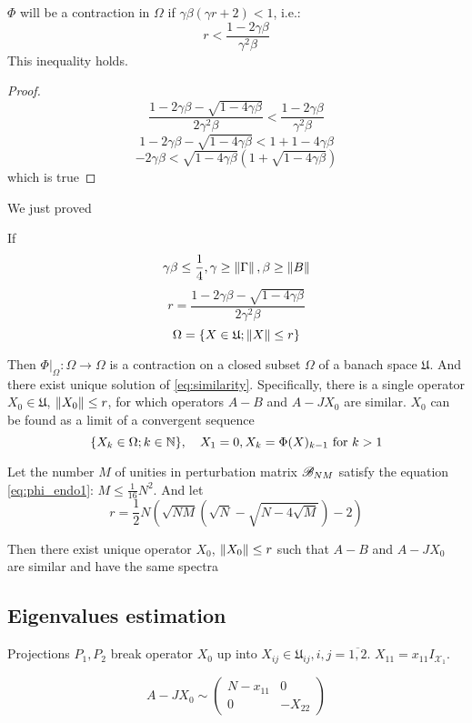 \documentclass{article}
\begin{document}
$\Phi$ will be a contraction in $\Omega$ if $\gamma\beta(\gamma r + 2) < 1$, i.e.:
$$r < \frac{1-2\gamma\beta}{\gamma^2\beta}$$
This inequality holds.
\begin{TRIVIA}
    \begin{proof}
        $$\frac{1-2\gamma\beta-\sqrt{1-4\gamma\beta}}{2\gamma^2\beta} < \frac{1-2\gamma\beta}{\gamma^2\beta}$$
        $$1-2\gamma\beta-\sqrt{1-4\gamma\beta} < 1+1-4\gamma\beta$$
        $$-2\gamma\beta<\sqrt{1-4\gamma\beta}\left(1+\sqrt{1-4\gamma\beta}\right)$$
        which is true
    \end{proof}
\end{TRIVIA}

We just proved
\begin{thm}
    If
    $$\gamma\beta\leq\frac14, \gamma\geq\left\|{\Gamma}\right\|, \beta\geq\left\|{B}\right\|$$
    $$r = \frac{1 - 2\gamma\beta - \sqrt{1-4\gamma\beta}}{2 \gamma^2 \beta}$$
    $$\Omega = \{ X\in\mathfrak U; \left\|{X}\right\| \leq r \}$$

    Then
    $\Phi|_{\Omega}:\Omega\to\Omega$ is a contraction on a closed subset $\Omega$ of a banach space $\mathfrak U$.
    And there exist unique solution of \eqref{eq:similarity}.
    Specifically, there is a single operator $X_0\in\mathfrak U$, $\left\|{X_0}\right\| \leq r$,
    for which operators $A-B$ and $A-JX_0$ are similar.
    $X_0$ can be found as a limit of a convergent sequence
    $$\{X_k\in\Omega; k\in\mathbb{N}\}, \quad X_1 = 0, X_k = \Phi(X)_{k-1} \text{ for } k>1$$
\end{thm}

\begin{corollary}
    Let the number $M$ of unities in perturbation matrix $\mathscr{B}_{{N}{M}}$
    satisfy the equation \eqref{eq:phi_endo1}: $M \leq \frac{1}{16} N^2$.
    And let
    \[ r = \frac12 N
        \left(
        \sqrt{NM}(\sqrt{N} - \sqrt{N-4\sqrt{M}}) - 2
        \right) \]

    Then there exist unique operator $X_0$, $\left\|{X_0}\right\| \leq r$ such that $A - B$ and $A - J X_0$ are similar
    and have the same spectra
\end{corollary}

\subsection{Eigenvalues estimation}
Projections $P_1, P_2$ break operator $X_0$ up into $X_{ij}\in\mathfrak U_{ij}, i,j=\overline{1,2}$.
$X_{11} = x_{11} I_{\mathcal X_1}$.

\[
    A-JX_0 \sim
    \left(
\begin{array}{c|c}
    N-x_{11} & 0 \\
    \hline
    0        & -X_{22}
\end{array}
\right)
\]
\end{document}
